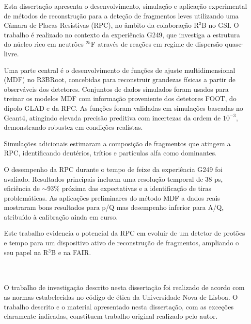 Esta dissertação apresenta o desenvolvimento, simulação e aplicação experimental de métodos de reconstrução para a deteção de fragmentos leves utilizando uma Câmara de Placas Resistivas (RPC), no âmbito da colaboração R$^3$B no GSI. O trabalho é realizado no contexto da experiência G249, que investiga a estrutura do núcleo rico em neutrões $^{25}$F através de reações em regime de dispersão quase-livre.

Uma parte central é o desenvolvimento de funções de ajuste multidimensional (MDF) no R3BRoot, concebidas para reconstruir grandezas físicas a partir de observáveis dos detetores. Conjuntos de dados simulados foram usados para treinar os modelos MDF com informação proveniente dos detetores FOOT, do dipolo GLAD e da RPC. As funções foram validadas em simulações baseadas no Geant4, atingindo elevada precisão preditiva com incertezas da ordem de $10^{-3}$, demonstrando robustez em condições realistas.

Simulações adicionais estimaram a composição de fragmentos que atingem a RPC, identificando deutérios, trítios e partículas alfa como dominantes.

O desempenho da RPC durante o tempo de feixe da experiência G249 foi avaliado. Resultados principais incluem uma resolução temporal de 38 ps, eficiência de $\sim$93\% próxima das expectativas e a identificação de tiras problemáticas. As aplicações preliminares do método MDF a dados reais mostraram bons resultados para p/Q mas desempenho inferior para A/Q, atribuído à calibração ainda em curso.

Este trabalho evidencia o potencial da RPC em evoluir de um detetor de protões e tempo para um dispositivo ativo de reconstrução de fragmentos, ampliando o seu papel na R$^3$B e na FAIR.

\\
\\
O trabalho de investigação descrito nesta dissertação foi realizado de acordo com as normas
estabelecidas no código de ética da Universidade Nova de Lisboa. O trabalho descrito e o
material apresentado nesta dissertação, com as exceções claramente indicadas, constituem
trabalho original realizado pelo autor.
